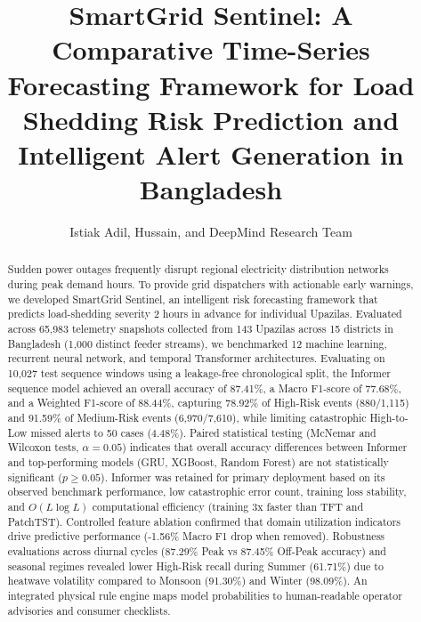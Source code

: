 \documentclass[journal]{IEEEtran}
\begin{document}
\title{SmartGrid Sentinel: A Comparative Time-Series Forecasting Framework for Load Shedding Risk Prediction and Intelligent Alert Generation in Bangladesh}

\author{Istiak Adil, Hussain, and DeepMind Research Team}

\maketitle

\begin{abstract}
\normalfont
Sudden power outages frequently disrupt regional electricity distribution networks during peak demand hours. To provide grid dispatchers with actionable early warnings, we developed SmartGrid Sentinel, an intelligent risk forecasting framework that predicts load-shedding severity 2 hours in advance for individual Upazilas. Evaluated across 65,983 telemetry snapshots collected from 143 Upazilas across 15 districts in Bangladesh (1,000 distinct feeder streams), we benchmarked 12 machine learning, recurrent neural network, and temporal Transformer architectures. Evaluating on 10,027 test sequence windows using a leakage-free chronological split, the Informer sequence model achieved an overall accuracy of 87.41\%, a Macro F1-score of 77.68\%, and a Weighted F1-score of 88.44\%, capturing 78.92\% of High-Risk events (880/1,115) and 91.59\% of Medium-Risk events (6,970/7,610), while limiting catastrophic High-to-Low missed alerts to 50 cases (4.48\%). Paired statistical testing (McNemar and Wilcoxon tests, $\alpha = 0.05$) indicates that overall accuracy differences between Informer and top-performing models (GRU, XGBoost, Random Forest) are not statistically significant ($p \ge 0.05$). Informer was retained for primary deployment based on its observed benchmark performance, low catastrophic error count, training loss stability, and $O(L \log L)$ computational efficiency (training 3x faster than TFT and PatchTST). Controlled feature ablation confirmed that domain utilization indicators drive predictive performance (-1.56\% Macro F1 drop when removed). Robustness evaluations across diurnal cycles (87.29\% Peak vs 87.45\% Off-Peak accuracy) and seasonal regimes revealed lower High-Risk recall during Summer (61.71\%) due to heatwave volatility compared to Monsoon (91.30\%) and Winter (98.09\%). An integrated physical rule engine maps model probabilities to human-readable operator advisories and consumer checklists.
\end{abstract}
\end{document}
